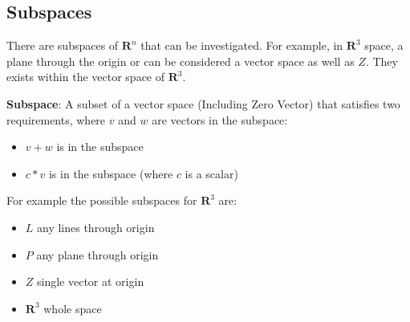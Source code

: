 \documentclass[10pt,a4paper]{article}
\begin{document}
\subsection{Subspaces}
There are subspaces of $\textbf{R}^n$ that can be investigated. For example, in $\textbf{R}^3$
space, a plane through the origin or can be considered a vector space as well as $Z$. They exists
within the vector space of $\textbf{R}^3$. 
\begin{tcolorbox}[breakable,colback=white,colframe=black,width=\dimexpr\textwidth+12mm\relax,enlarge
left by=-6mm] 
	\textbf{Subspace}: A subset of a vector space (Including Zero Vector) that satisfies two
		requirements, where $v$ and $w$ are vectors in the subspace: 
		\begin{itemize}
			\item $v+w$ is in the subspace
			\item $c*v$ is in the subspace (where $c$ is a scalar)
		\end{itemize}
\end{tcolorbox}

For example the possible subspaces for $\textbf{R}^3$ are:
\begin{itemize}
	\item $L$ any lines through origin
	\item $P$ any plane through origin
	\item $Z$ single vector at origin
	\item $\textbf{R}^3$ whole space
\end{itemize}
\vfill{}
\end{document}
